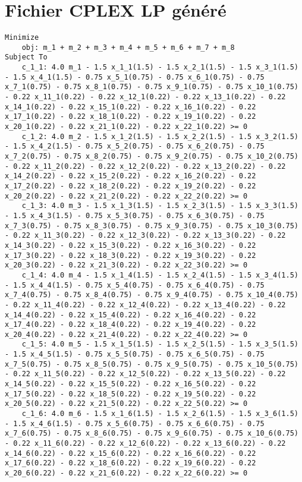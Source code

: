 \documentclass{article}[A4]
\begin{document}
\section{Fichier CPLEX LP généré}
\begin{lstlisting}
Minimize
	obj: m_1 + m_2 + m_3 + m_4 + m_5 + m_6 + m_7 + m_8
Subject To
	c_1_1: 4.0 m_1 - 1.5 x_1_1(1.5) - 1.5 x_2_1(1.5) - 1.5 x_3_1(1.5) - 1.5 x_4_1(1.5) - 0.75 x_5_1(0.75) - 0.75 x_6_1(0.75) - 0.75 x_7_1(0.75) - 0.75 x_8_1(0.75) - 0.75 x_9_1(0.75) - 0.75 x_10_1(0.75) - 0.22 x_11_1(0.22) - 0.22 x_12_1(0.22) - 0.22 x_13_1(0.22) - 0.22 x_14_1(0.22) - 0.22 x_15_1(0.22) - 0.22 x_16_1(0.22) - 0.22 x_17_1(0.22) - 0.22 x_18_1(0.22) - 0.22 x_19_1(0.22) - 0.22 x_20_1(0.22) - 0.22 x_21_1(0.22) - 0.22 x_22_1(0.22) >= 0
	c_1_2: 4.0 m_2 - 1.5 x_1_2(1.5) - 1.5 x_2_2(1.5) - 1.5 x_3_2(1.5) - 1.5 x_4_2(1.5) - 0.75 x_5_2(0.75) - 0.75 x_6_2(0.75) - 0.75 x_7_2(0.75) - 0.75 x_8_2(0.75) - 0.75 x_9_2(0.75) - 0.75 x_10_2(0.75) - 0.22 x_11_2(0.22) - 0.22 x_12_2(0.22) - 0.22 x_13_2(0.22) - 0.22 x_14_2(0.22) - 0.22 x_15_2(0.22) - 0.22 x_16_2(0.22) - 0.22 x_17_2(0.22) - 0.22 x_18_2(0.22) - 0.22 x_19_2(0.22) - 0.22 x_20_2(0.22) - 0.22 x_21_2(0.22) - 0.22 x_22_2(0.22) >= 0
	c_1_3: 4.0 m_3 - 1.5 x_1_3(1.5) - 1.5 x_2_3(1.5) - 1.5 x_3_3(1.5) - 1.5 x_4_3(1.5) - 0.75 x_5_3(0.75) - 0.75 x_6_3(0.75) - 0.75 x_7_3(0.75) - 0.75 x_8_3(0.75) - 0.75 x_9_3(0.75) - 0.75 x_10_3(0.75) - 0.22 x_11_3(0.22) - 0.22 x_12_3(0.22) - 0.22 x_13_3(0.22) - 0.22 x_14_3(0.22) - 0.22 x_15_3(0.22) - 0.22 x_16_3(0.22) - 0.22 x_17_3(0.22) - 0.22 x_18_3(0.22) - 0.22 x_19_3(0.22) - 0.22 x_20_3(0.22) - 0.22 x_21_3(0.22) - 0.22 x_22_3(0.22) >= 0
	c_1_4: 4.0 m_4 - 1.5 x_1_4(1.5) - 1.5 x_2_4(1.5) - 1.5 x_3_4(1.5) - 1.5 x_4_4(1.5) - 0.75 x_5_4(0.75) - 0.75 x_6_4(0.75) - 0.75 x_7_4(0.75) - 0.75 x_8_4(0.75) - 0.75 x_9_4(0.75) - 0.75 x_10_4(0.75) - 0.22 x_11_4(0.22) - 0.22 x_12_4(0.22) - 0.22 x_13_4(0.22) - 0.22 x_14_4(0.22) - 0.22 x_15_4(0.22) - 0.22 x_16_4(0.22) - 0.22 x_17_4(0.22) - 0.22 x_18_4(0.22) - 0.22 x_19_4(0.22) - 0.22 x_20_4(0.22) - 0.22 x_21_4(0.22) - 0.22 x_22_4(0.22) >= 0
	c_1_5: 4.0 m_5 - 1.5 x_1_5(1.5) - 1.5 x_2_5(1.5) - 1.5 x_3_5(1.5) - 1.5 x_4_5(1.5) - 0.75 x_5_5(0.75) - 0.75 x_6_5(0.75) - 0.75 x_7_5(0.75) - 0.75 x_8_5(0.75) - 0.75 x_9_5(0.75) - 0.75 x_10_5(0.75) - 0.22 x_11_5(0.22) - 0.22 x_12_5(0.22) - 0.22 x_13_5(0.22) - 0.22 x_14_5(0.22) - 0.22 x_15_5(0.22) - 0.22 x_16_5(0.22) - 0.22 x_17_5(0.22) - 0.22 x_18_5(0.22) - 0.22 x_19_5(0.22) - 0.22 x_20_5(0.22) - 0.22 x_21_5(0.22) - 0.22 x_22_5(0.22) >= 0
	c_1_6: 4.0 m_6 - 1.5 x_1_6(1.5) - 1.5 x_2_6(1.5) - 1.5 x_3_6(1.5) - 1.5 x_4_6(1.5) - 0.75 x_5_6(0.75) - 0.75 x_6_6(0.75) - 0.75 x_7_6(0.75) - 0.75 x_8_6(0.75) - 0.75 x_9_6(0.75) - 0.75 x_10_6(0.75) - 0.22 x_11_6(0.22) - 0.22 x_12_6(0.22) - 0.22 x_13_6(0.22) - 0.22 x_14_6(0.22) - 0.22 x_15_6(0.22) - 0.22 x_16_6(0.22) - 0.22 x_17_6(0.22) - 0.22 x_18_6(0.22) - 0.22 x_19_6(0.22) - 0.22 x_20_6(0.22) - 0.22 x_21_6(0.22) - 0.22 x_22_6(0.22) >= 0

\end{lstlisting}
\end{document}
